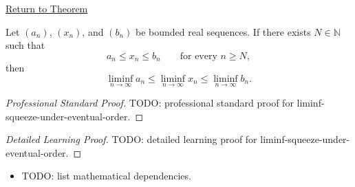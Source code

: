 \newpage
{}
\label{prf:liminf-squeeze-under-eventual-order}

\begin{remark*}[Return]
\hyperref[thm:liminf-squeeze-under-eventual-order]{Return to Theorem}
\end{remark*}

\begin{theorem*}
Let $(a_n)$, $(x_n)$, and $(b_n)$ be bounded real sequences. If there
exists $N\in\mathbb{N}$ such that
\[
  a_n\le x_n\le b_n
  \qquad\text{for every }n\ge N,
\]
then
\[
  \liminf_{n\to\infty}a_n
  \le
  \liminf_{n\to\infty}x_n
  \le
  \liminf_{n\to\infty}b_n.
\]

\smallskip
\noindent
\end{theorem*}

\begin{proof}[Professional Standard Proof]
\LRAProofBodyStart
TODO: professional standard proof for liminf-squeeze-under-eventual-order.
\end{proof}

\begin{proof}[Detailed Learning Proof]
\LRAProofBodyStart
TODO: detailed learning proof for liminf-squeeze-under-eventual-order.
\end{proof}

\begin{remark*}
\end{remark*}

\begin{dependencies}
\begin{itemize}
  \item TODO: list mathematical dependencies.
\end{itemize}
\end{dependencies}

\clearpage
